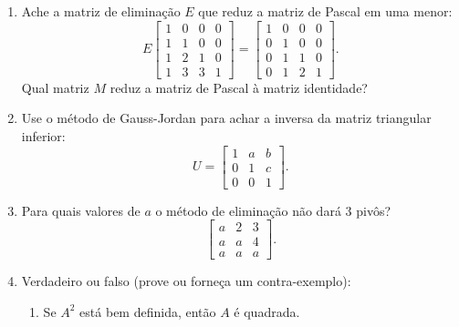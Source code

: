 \documentclass[leqno]{article}
\numberwithin{equation}{section}
\begin{document}
\begin{enumerate}

\item Ache a matriz de eliminação $E$ que reduz a matriz de Pascal em uma menor:
$$E \begin{bmatrix} 1 & 0 & 0 & 0 \\
1 & 1 & 0 & 0 \\
1 & 2 & 1 & 0 \\
1 & 3 & 3 & 1
\end{bmatrix} = \begin{bmatrix} 1 & 0 & 0 & 0 \\
0 & 1 & 0 & 0 \\
0 & 1 & 1 & 0 \\
0 & 1 & 2 & 1 
\end{bmatrix}.$$
Qual matriz $M$ reduz a matriz de Pascal à matriz identidade?

\begin{sol} 
\end{sol} 

\item Use o método de Gauss-Jordan para achar a inversa da matriz triangular inferior:
$$U = \begin{bmatrix} 1 & a & b  \\
0 & 1 & c  \\
0 & 0 & 1 
\end{bmatrix}.$$

\begin{sol} 
\end{sol} 

\item Para quais valores de $a$ o método de eliminação não dará 3 pivôs?
$$\begin{bmatrix} 
a & 2 & 3  \\
a & a & 4  \\
a & a & a 
\end{bmatrix}.$$

\begin{sol} 
\end{sol} 

\item Verdadeiro ou falso (prove ou forneça um contra-exemplo):

\begin{enumerate}

\item Se $A^2$ está bem definida, então $A$ é quadrada.


\end{enumerate}
\end{enumerate}
\end{document}
